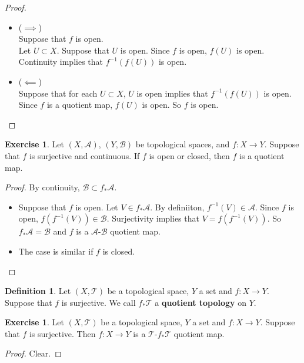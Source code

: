 \documentclass[12pt]{amsart}
\theoremstyle{definition}
\newtheorem{defn}[definition]{Definition}
\newtheorem{ex}[definition]{Exercise}
\newcommand{\MA}{\mathcal{A}}
\newcommand{\MB}{\mathcal{B}}
\newcommand{\MT}{\mathcal{T}}
\newcommand{\tbf}[1]{\textbf{#1}}
\DeclareMathOperator*{\0}{\mbf{0}}
\DeclareMathOperator*{\1}{\mbf{1}}
\newcommand{\lex}[1]{\label{ex:#1}}
\newcommand{\ld}[1]{\label{defn:#1}}
\begin{document}
	\begin{proof}\
	\begin{itemize}	
	\item ($\implies$) \\
	Suppose that $f$ is open.\\
	Let $U \subset X$. Suppose that $U$ is open. Since $f$ is open, $f(U)$ is open. Continuity implies that $f^{-1}(f(U))$ is open.\\ 
	\item ($\impliedby$) \\
	Suppose that for each $U \subset X$, $U$ is open implies that $f^{-1}(f(U))$ is open. \\
	Since $f$ is a quotient map, $f(U)$ is open. So $f$ is open.
	
	\end{itemize}
	\end{proof}
	
	\begin{ex} \lex{34008}
	Let $(X, \MA)$, $(Y, \MB)$ be topological spaces, and $f:X \rightarrow Y$. Suppose that $f$ is surjective and continuous. If $f$ is open or closed, then $f$ is a quotient map.
	\end{ex}
	
	\begin{proof}
	By continuity, $\MB \subset f_*\MA$. 
	\begin{itemize}
	\item Suppose that $f$ is open. Let $V \in f_*\MA$. By definiiton, $f^{-1}(V) \in \MA$. Since $f$ is open, $f(f^{-1}(V)) \in \MB$. Surjectivity implies that $V = f(f^{-1}(V))$. So $f_*\MA = \MB$ and $f$ is a $\MA$-$\MB$ quotient map.
	\item The case is similar if $f$ is closed.
	\end{itemize}
	\end{proof}
	
	
	\begin{defn} \ld{34006}
	Let $(X, \MT)$ be a topological space, $Y$ a set and $f:X \rightarrow Y$. Suppose that $f$ is surjective.	
	 We call $f_* \MT$ a \tbf{quotient topology} on $Y$.  
	\end{defn}
	
	\begin{ex} \lex{34007}
	Let $(X, \MT)$ be a topological space, $Y$ a set and $f:X \rightarrow Y$. Suppose that $f$ is surjective. Then $f: X \rightarrow Y$ is a $\MT$-$f_*\MT$ quotient map. 
	\end{ex}
	
	\begin{proof}
	Clear.
	\end{proof}
	
\end{document}

